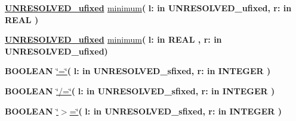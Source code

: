 \begin{DoxyCompactItemize}
\item 
{\bfseries {\bfseries {\bfseries \hyperlink{classfixed__pkg_ae78bc2b36d22f6abeac163955e8a587d}{U\+N\+R\+E\+S\+O\+L\+V\+E\+D\+\_\+ufixed}} \textcolor{vhdlchar}{ }}} \hyperlink{classfixed__pkg_ae6f8be7af801cf9cb3dcc7b877059955}{minimum}{\bfseries  ( }{\bfseries \textcolor{vhdlchar}{l\+: }\textcolor{stringliteral}{in }\textcolor{vhdlchar}{U\+N\+R\+E\+S\+O\+L\+V\+E\+D\+\_\+ufixed}}{\bfseries  , \textcolor{vhdlchar}{r\+: }\textcolor{stringliteral}{in }{\bfseries \textcolor{comment}{R\+E\+A\+L}\textcolor{vhdlchar}{ }}}{\bfseries  )} 
\item 
{\bfseries {\bfseries {\bfseries \hyperlink{classfixed__pkg_ae78bc2b36d22f6abeac163955e8a587d}{U\+N\+R\+E\+S\+O\+L\+V\+E\+D\+\_\+ufixed}} \textcolor{vhdlchar}{ }}} \hyperlink{classfixed__pkg_ae6f8be7af801cf9cb3dcc7b877059955}{minimum}{\bfseries  ( }{\bfseries \textcolor{vhdlchar}{l\+: }\textcolor{stringliteral}{in }{\bfseries \textcolor{comment}{R\+E\+A\+L}\textcolor{vhdlchar}{ }}}{\bfseries  , \textcolor{vhdlchar}{r\+: }\textcolor{stringliteral}{in }\textcolor{vhdlchar}{U\+N\+R\+E\+S\+O\+L\+V\+E\+D\+\_\+ufixed}}{\bfseries  )} 
\item 
{\bfseries {\bfseries \textcolor{comment}{B\+O\+O\+L\+E\+A\+N}\textcolor{vhdlchar}{ }}} \hyperlink{classfixed__pkg_a7949e9258ea0749e3b35961feea8db87}{\char`\"{}=\char`\"{}}{\bfseries  ( }{\bfseries \textcolor{vhdlchar}{l\+: }\textcolor{stringliteral}{in }\textcolor{vhdlchar}{U\+N\+R\+E\+S\+O\+L\+V\+E\+D\+\_\+sfixed}}{\bfseries  , \textcolor{vhdlchar}{r\+: }\textcolor{stringliteral}{in }{\bfseries \textcolor{comment}{I\+N\+T\+E\+G\+E\+R}\textcolor{vhdlchar}{ }}}{\bfseries  )} 
\item 
{\bfseries {\bfseries \textcolor{comment}{B\+O\+O\+L\+E\+A\+N}\textcolor{vhdlchar}{ }}} \hyperlink{classfixed__pkg_a00087aded97b434060226b9ba63a9077}{\char`\"{}/=\char`\"{}}{\bfseries  ( }{\bfseries \textcolor{vhdlchar}{l\+: }\textcolor{stringliteral}{in }\textcolor{vhdlchar}{U\+N\+R\+E\+S\+O\+L\+V\+E\+D\+\_\+sfixed}}{\bfseries  , \textcolor{vhdlchar}{r\+: }\textcolor{stringliteral}{in }{\bfseries \textcolor{comment}{I\+N\+T\+E\+G\+E\+R}\textcolor{vhdlchar}{ }}}{\bfseries  )} 
\item 
{\bfseries {\bfseries \textcolor{comment}{B\+O\+O\+L\+E\+A\+N}\textcolor{vhdlchar}{ }}} \hyperlink{classfixed__pkg_a4cd07e388cdbb3996dd11f56781d3758}{\char`\"{}$>$=\char`\"{}}{\bfseries  ( }{\bfseries \textcolor{vhdlchar}{l\+: }\textcolor{stringliteral}{in }\textcolor{vhdlchar}{U\+N\+R\+E\+S\+O\+L\+V\+E\+D\+\_\+sfixed}}{\bfseries  , \textcolor{vhdlchar}{r\+: }\textcolor{stringliteral}{in }{\bfseries \textcolor{comment}{I\+N\+T\+E\+G\+E\+R}\textcolor{vhdlchar}{ }}}{\bfseries  )} 

\end{DoxyCompactItemize}

